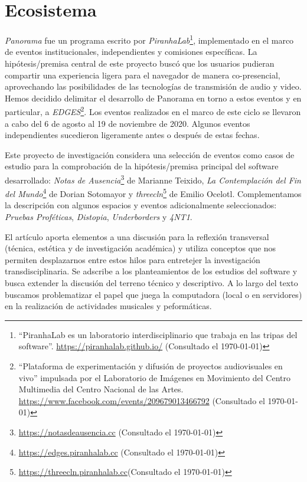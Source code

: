 
\section*{Ecosistema}


\textit{Panorama} \citep{panorama} fue un programa escrito por \textit{PiranhaLab}\footnote{``PiranhaLab es un laboratorio interdisciplinario que trabaja en las tripas del software''. \url{https://piranhalab.github.io/} (Consultado el \today)}, implementado en el marco de eventos institucionales, independientes y comisiones específicas. La hipótesis/premisa central de este proyecto buscó que los usuarios pudieran compartir una experiencia ligera para el navegador de manera co-presencial, aprovechando las posibilidades de las tecnologías de transmisión de audio y video. %
Hemos decidido delimitar el desarrollo de Panorama en torno a estos eventos y en particular, a \textit{EDGES}\footnote{``Plataforma de experimentación y difusión de proyectos audiovisuales en vivo'' impulsada por el Laboratorio de Imágenes en Movimiento del Centro Multimedia del Centro Nacional de las Artes. \url{https://www.facebook.com/events/209679013466792} (Consultado el \today)}. Los eventos realizados en el marco de este ciclo se llevaron a cabo del 6 de agosto al 19 de noviembre de 2020. Algunos eventos independientes sucedieron ligeramente antes o después de estas fechas. 	

Este proyecto de investigación considera una selección de eventos como casos de estudio para la comprobación de la hipótesis/premisa principal del software desarrollado: \textit{Notas de Ausencia}\footnote{\url{https://notasdeausencia.cc} (Consultado el \today)} de Marianne Teixido, \textit{La Contemplación del Fin del Mundo}\footnote{\url{https://edges.piranhalab.cc} (Consultado el \today)} de Dorian Sotomayor y \textit{threecln}\footnote{\url{https://threecln.piranhalab.cc}(Consultado el \today)} de Emilio Ocelotl. Complementamos la descripción con algunos espacios y eventos adicionalmente seleccionados: \textit{Pruebas Proféticas}, \textit{Distopia}, \textit{Underborders} y \textit{4NT1}. %

El artículo aporta elementos a una discusión para la reflexión transversal (técnica, estética y  de investigación académica) y utiliza conceptos que nos permiten desplazarnos entre estos hilos para entretejer la investigación transdisciplinaria. Se adscribe a los planteamientos de los estudios del software y busca extender la discusión del terreno técnico y descriptivo. A lo largo del texto buscamos problematizar el papel que juega la computadora (local o en servidores) en la realización de actividades musicales y peformáticas.


